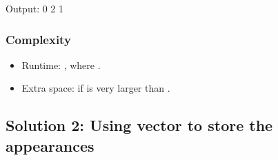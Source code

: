\documentclass[letterpaper,12pt,english]{book}
\begin{document}
\begin{sphinxVerbatim}[commandchars=\\\{\}]
\end{sphinxVerbatim}

\begin{sphinxVerbatim}[commandchars=\\\{\}]
Output:
0
2
\PYGZhy{}1
\end{sphinxVerbatim}


\subsubsection{Complexity}
\label{\detokenize{Counting/387_First_Unique_Character_in_a_String:complexity}}\begin{itemize}
\item {} 
\sphinxAtStartPar
Runtime: , where .

\item {} 
\sphinxAtStartPar
Extra space:  if  is very larger than .

\end{itemize}


\subsection{Solution 2: Using vector to store the appearances}
\label{\detokenize{Counting/387_First_Unique_Character_in_a_String:solution-2-using-vector-to-store-the-appearances}}
\end{document}
